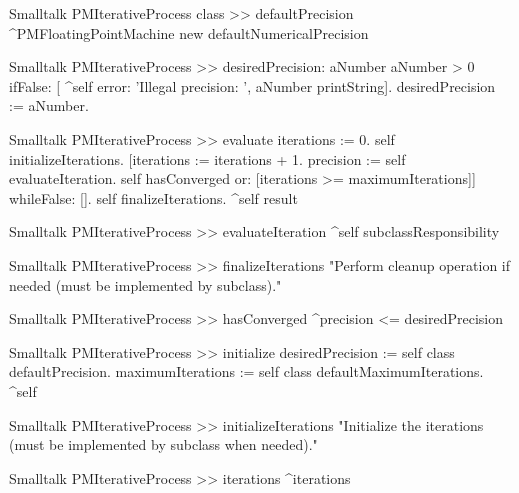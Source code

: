 \begin{displaycode}{Smalltalk}
PMIterativeProcess class >> defaultPrecision
    ^PMFloatingPointMachine new defaultNumericalPrecision
\end{displaycode}

\begin{displaycode}{Smalltalk}
PMIterativeProcess >> desiredPrecision: aNumber
    aNumber > 0
        ifFalse: [ ^self error: 'Illegal precision: ', aNumber 
                                                         printString].
    desiredPrecision := aNumber.
\end{displaycode}

\begin{displaycode}{Smalltalk}
PMIterativeProcess >> evaluate
    iterations := 0.
    self initializeIterations.
    [iterations := iterations + 1.
    precision := self evaluateIteration.
    self hasConverged or: [iterations >= maximumIterations]] 
            whileFalse: [].
    self finalizeIterations.
    ^self result
\end{displaycode}

\begin{displaycode}{Smalltalk}
PMIterativeProcess >> evaluateIteration
    ^self subclassResponsibility
\end{displaycode}

\begin{displaycode}{Smalltalk}
PMIterativeProcess >> finalizeIterations
   "Perform cleanup operation if needed (must be implemented by subclass)."
\end{displaycode}

\begin{displaycode}{Smalltalk}
PMIterativeProcess >> hasConverged
    ^precision <= desiredPrecision
\end{displaycode}

\begin{displaycode}{Smalltalk}
PMIterativeProcess >> initialize
    desiredPrecision := self class defaultPrecision.
    maximumIterations := self class defaultMaximumIterations.
    ^self
\end{displaycode}

\begin{displaycode}{Smalltalk}
PMIterativeProcess >> initializeIterations
   "Initialize the iterations (must be implemented by subclass when needed)."
\end{displaycode}

\begin{displaycode}{Smalltalk}
PMIterativeProcess >> iterations
    ^iterations
\end{displaycode}

